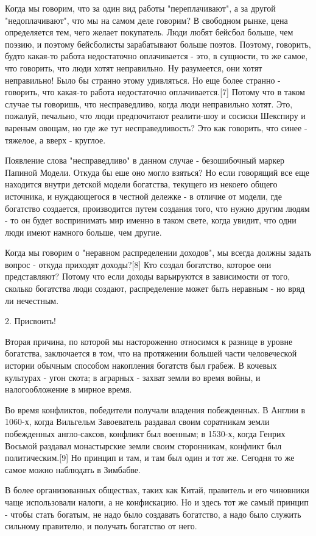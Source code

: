 \documentclass[ebook,12pt,oneside,openany]{memoir}
\begin{document}
Когда мы говорим, что за один вид работы "переплачивают", а за другой
"недоплачивают", что мы на самом деле говорим? В свободном рынке, цена
определяется тем, чего желает покупатель. Люди любят бейсбол больше,
чем поэзию, и поэтому бейсболисты зарабатывают больше поэтов. Поэтому,
говорить, будто какая-то работа недостаточно оплачивается - это, в
сущности, то же самое, что говорить, что люди хотят неправильно. Ну
разумеется, они хотят неправильно! Было бы странно этому удивляться.
Но еще более странно - говорить, что какая-то работа недостаточно
оплачивается.[7] Потому что в таком случае ты говоришь, что
несправедливо, когда люди неправильно хотят. Это, пожалуй, печально,
что люди предпочитают реалити-шоу и сосиски Шекспиру и вареным овощам,
но где же тут несправедливость? Это как говорить, что синее - тяжелое,
а вверх - круглое.

Появление слова "несправедливо" в данном случае - безошибочный маркер
Папиной Модели. Откуда бы еше оно могло взяться? Но если говорящий все
еще находится внутри детской модели богатства, текущего из некоего
общего источника, и нуждающегося в честной дележке - в отличие от
модели, где богатство создается, производится путем создания того, что
нужно другим людям - то он будет воспринимать мир именно в таком
свете, когда увидит, что одни люди имеют намного больше, чем другие.

Когда мы говорим о "неравном распределении доходов", мы всегда должны
задать вопрос - откуда приходят доходы?[8] Кто создал богатство,
которое они представляют? Потому что если доходы варьируются в
зависимости от того, сколько богатства люди создают, распределение
может быть неравным - но вряд ли нечестным.


2. Присвоить!

Вторая причина, по которой мы настороженно относимся к разнице в
уровне богатства, заключается в том, что на протяжении большей части
человеческой истории обычным способом накопления богатств был грабеж.
В кочевых культурах - угон скота; в аграрных - захват земли во время
войны, и налогообложение в мирное время.

Во время конфликтов, победители получали владения побежденных. В
Англии в 1060-х, когда Вильгельм Завоеватель раздавал своим соратникам
земли побежденных англо-саксов, конфликт был военным; в 1530-х, когда
Генрих Восьмой раздавал монастырские земли своим сторонникам, конфликт
был политическим.[9] Но принцип и там, и там был один и тот же.
Сегодня то же самое можно наблюдать в Зимбабве.

В более организованных обществах, таких как Китай, правитель и его
чиновники чаще использовали налоги, а не конфискацию. Но и здесь тот
же самый принцип - чтобы стать богатым, не надо было создавать
богатство, а надо было служить сильному правителю, и получать
богатство от него.
\end{document}
